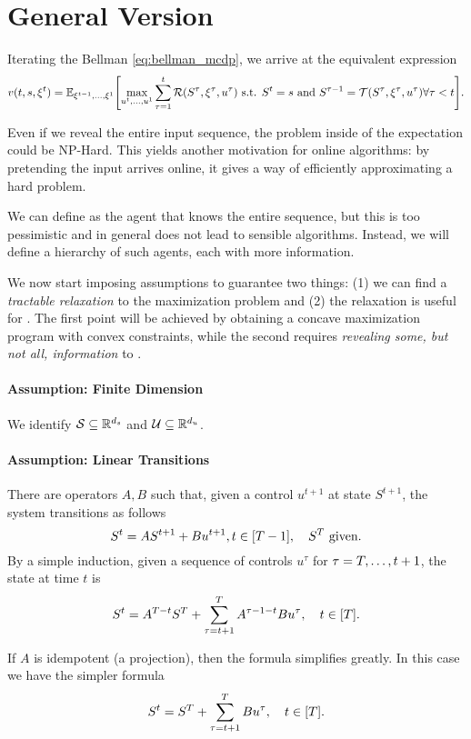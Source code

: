 \documentclass[letterpaper,11pt]{article}
\begin{document}
\section{General Version}

Iterating the Bellman \cref{eq:bellman_mcdp}, we arrive at the equivalent expression 
\begin{equation}
v(t,s,\xit) = \E_{\xi^{t-1},\ldots,\xi^1}\brk*{\max_{u^t,\ldots,u^1}\sum_{\tau=1}^t\Re(S^\tau,\xi^\tau,u^\tau) \text{ s.t. }  S^t=s \text{ and } S^{\tau-1}=\Tr(S^\tau,\xi^\tau,u^\tau) \forall \tau<t }.
\end{equation}

Even if we reveal the entire input sequence, the problem inside of the expectation could be NP-Hard.
This yields another motivation for online algorithms: by pretending the input arrives online, it gives a way of efficiently approximating a hard problem.

We can define \off as the agent that knows the entire sequence, but this is too pessimistic and in general does not lead to sensible algorithms.
Instead, we will define a hierarchy of such agents, each with more information.

We now start imposing assumptions to guarantee two things: (1) we can find a \emph{tractable relaxation} to the maximization problem and (2) the relaxation is useful for \onl.
The first point will be achieved by obtaining a concave maximization program with convex constraints, while the second requires \emph{revealing some, but not all, information} to \off.

\paragraph{Assumption: Finite Dimension}
We identify $\mathcal{S}\subseteq \mathbb{R}^{d_s}$ and $\mathcal{U}\subseteq\mathbb{R}^{d_u}$.

\paragraph{Assumption: Linear Transitions}
There are operators $A,B$ such that, given a control $u^{t+1}$ at state $S^{t+1}$, the system transitions as follows
\[
S^{t} = AS^{t+1} + Bu^{t+1}, t\in[T-1], \quad 
S^T \text{ given}.
\]
By a simple induction, given a sequence of controls $u^\tau$ for $\tau=T,\ldots,t+1$, the state at time $t$ is
\[
S^t = A^{T-t}S^T + \sum_{\tau=t+1}^T A^{\tau-1-t}Bu^\tau, \quad t\in[T].
\]

If $A$ is idempotent (a projection), then the formula simplifies greatly.
In this case we have the simpler formula
\begin{equation}\label{eq:linear_state}
S^t = S^T + \sum_{\tau=t+1}^T Bu^\tau, \quad t\in[T].
\end{equation}
\end{document}
